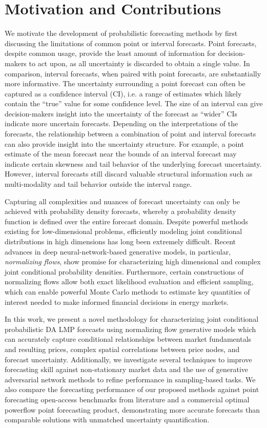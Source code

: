 \section{Motivation and Contributions}\label{sec:motivation}

We motivate the development of probabilistic forecasting methods by first discussing the limitations of common
point or interval forecasts.
Point forecasts, despite common usage, provide the least amount of information for decision-makers to act upon, as
all uncertainty is discarded to obtain a single value.
In comparison, interval forecasts, when paired with point forecasts, are substantially more informative.
The uncertainty surrounding a point forecast can often be captured as a confidence interval (CI), i.e. a range of
estimates which likely contain the ``true'' value for some confidence level.
The size of an interval can give decision-makers insight into the uncertainty of the forecast as ``wider'' CIs indicate
more uncertain forecasts.
Depending on the interpretations of the forecasts, the relationship between a combination of point and interval
forecasts can also provide insight into the uncertainty structure.
For example, a point estimate of the mean forecast near the bounds of an interval forecast may indicate certain
skewness and tail behavior of the underlying forecast uncertainty.
However, interval forecasts still discard valuable structural information such as multi-modality and tail behavior
outside the interval range.

Capturing all complexities and nuances of forecast uncertainty can only be achieved with probability density forecasts,
whereby a probability density function is defined over the entire forecast domain.
Despite powerful methods existing for low-dimensional problems, efficiently modeling joint conditional
distributions in high dimensions has long been extremely difficult.
Recent advances in deep neural-network-based generative models, in particular, \textit{normalizing flows}, show promise
for characterizing high dimensional and complex joint conditional probability densities.
Furthermore, certain constructions of normalizing flows allow both exact likelihood evaluation and efficient sampling,
which can enable powerful Monte Carlo methods to estimate key quantities of interest needed to make informed financial
decisions in energy markets.

In this work, we present a novel methodology for characterizing joint conditional probabilistic DA LMP
forecasts using normalizing flow generative models which can accurately capture conditional relationships
between market fundamentals and resulting prices, complex spatial correlations between price nodes, and forecast
uncertainty.
Additionally, we investigate several techniques to improve forecasting skill against non-stationary market data and the
use of generative adversarial network methods to refine performance in sampling-based tasks.
We also compare the forecasting performance of our proposed methods against point forecasting open-access benchmarks
from literature and a commercial optimal powerflow point forecasting product, demonstrating more
accurate forecasts than comparable solutions with unmatched uncertainty quantification.


